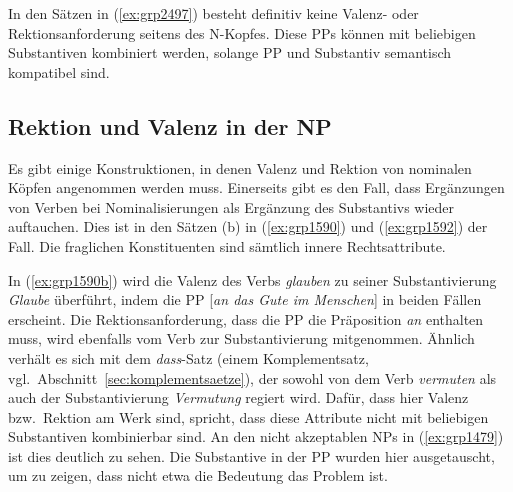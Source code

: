 In den Sätzen in (\ref{ex:grp2497}) besteht definitiv keine Valenz- oder Rektionsanforderung seitens des N-Kopfes.
Diese PPs können mit beliebigen Substantiven kombiniert werden, solange PP und Substantiv semantisch kompatibel sind.

\subsection{Rektion und Valenz in der NP}

\label{sec:rektioninderngr}


Es gibt einige Konstruktionen, in denen Valenz und Rektion von nominalen Köpfen angenommen werden muss.
Einerseits gibt es den Fall, dass Ergänzungen von Verben bei Nominalisierungen als Ergänzung des Substantivs wieder auftauchen.
Dies ist in den Sätzen (b) in (\ref{ex:grp1590}) und (\ref{ex:grp1592}) der Fall.
Die fraglichen Konstituenten sind sämtlich innere Rechtsattribute.

\begin{exe}
  \ex\label{ex:grp1590}
  \begin{xlist}
  \end{xlist}
  \ex\label{ex:grp1592}
  \begin{xlist}
  \end{xlist}
\end{exe}

In (\ref{ex:grp1590b}) wird die Valenz des Verbs \textit{glauben} zu seiner Substantivierung \textit{Glaube} überführt, indem die PP [\textit{an das Gute im Menschen}] in beiden Fällen erscheint.
Die Rektionsanforderung, dass die PP die Präposition \textit{an} enthalten muss, wird ebenfalls vom Verb zur Substantivierung mitgenommen.
Ähnlich verhält es sich mit dem \textit{dass}-Satz (einem Komplementsatz, vgl.\ Abschnitt~\ref{sec:komplementsaetze}), der sowohl von dem Verb \textit{vermuten} als auch der Substantivierung \textit{Vermutung} regiert wird.
Dafür, dass hier Valenz bzw.\ Rektion am Werk sind, spricht, dass diese Attribute nicht mit beliebigen Substantiven kombinierbar sind.
An den nicht akzeptablen NPs in (\ref{ex:grp1479}) ist dies deutlich zu sehen.
Die Substantive in der PP wurden hier ausgetauscht, um zu zeigen, dass nicht etwa die Bedeutung das Problem ist.

